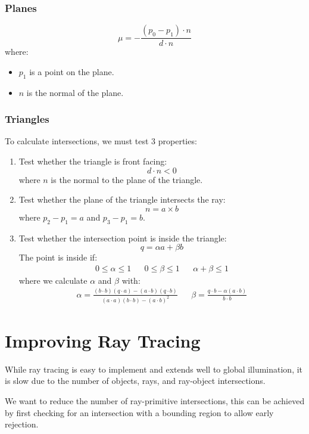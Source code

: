 \documentclass[11pt]{article}
\begin{document}
\subsubsection{Planes}
\[
  \mu = - \frac{(p_0 - p_1) \cdot n}{d \cdot n} 
\]
where:
\begin{itemize}
  \item $p_1$ is a point on the plane.
  \item $n$ is the normal of the plane.
\end{itemize}

\subsubsection{Triangles}
To calculate intersections, we must test 3 properties:
\begin{enumerate}
  \item Test whether the triangle is front facing:
    \[
      d \cdot n < 0 
    \]
    where $n$ is the normal to the plane of the triangle.
  \item Test whether the plane of the triangle intersects the ray:
    \[
      n = a \times b
    \]
    where $p_2 - p_1 = a$ and $p_3 - p_1 = b$.
  \item Test whether the intersection point is inside the triangle:
    \[
      q = \alpha a + \beta b
    \]
    The point is inside if:
    \begin{align*}
      0 \leq \alpha \leq 1 && 0 \leq \beta \leq 1 && \alpha + \beta \leq 1
    \end{align*}
    where we calculate $\alpha$ and $\beta$ with:
    \begin{align*}
      \alpha = \frac{(b \cdot b)(q \cdot a) - (a \cdot b)(q \cdot b)}{(a \cdot a)(b \cdot b) - (a \cdot b)^2}
      &&
      \beta = \frac{q \cdot b - \alpha(a \cdot b)}{b \cdot b}
    \end{align*}
\end{enumerate}

\section{Improving Ray Tracing}
While ray tracing is easy to implement and extends well to global illumination, it is slow due to the number of objects, rays, and ray-object intersections.

We want to reduce the number of ray-primitive intersections, this can be achieved by first checking for an intersection with a bounding region to allow early rejection.
\end{document}
